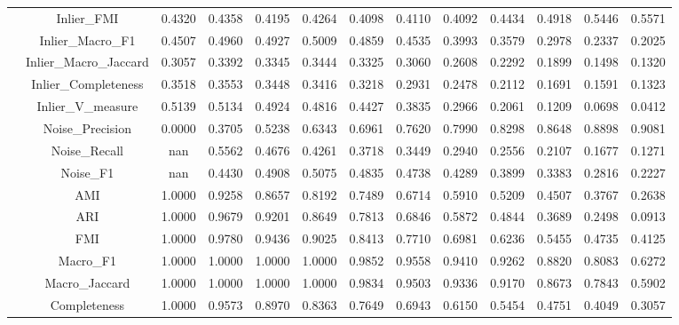 \begin{table}[ht!]
\begin{tabular*}{\linewidth}{@{} lc c c c c c c c c c c c @{}}
 & Inlier_FMI  & 0.4320 & 0.4358 & 0.4195 & 0.4264 & 0.4098 & 0.4110 & 0.4092 & 0.4434 & 0.4918 & 0.5446 & 0.5571 \\

 & Inlier_Macro_F1  & 0.4507 & 0.4960 & 0.4927 & 0.5009 & 0.4859 & 0.4535 & 0.3993 & 0.3579 & 0.2978 & 0.2337 & 0.2025 \\

 & Inlier_Macro_Jaccard  & 0.3057 & 0.3392 & 0.3345 & 0.3444 & 0.3325 & 0.3060 & 0.2608 & 0.2292 & 0.1899 & 0.1498 & 0.1320 \\

 & Inlier_Completeness  & 0.3518 & 0.3553 & 0.3448 & 0.3416 & 0.3218 & 0.2931 & 0.2478 & 0.2112 & 0.1691 & 0.1591 & 0.1323 \\

 & Inlier_V_measure  & 0.5139 & 0.5134 & 0.4924 & 0.4816 & 0.4427 & 0.3835 & 0.2966 & 0.2061 & 0.1209 & 0.0698 & 0.0412 \\

 & Noise_Precision  & 0.0000 & 0.3705 & 0.5238 & 0.6343 & 0.6961 & 0.7620 & 0.7990 & 0.8298 & 0.8648 & 0.8898 & 0.9081 \\

 & Noise_Recall  & nan & 0.5562 & 0.4676 & 0.4261 & 0.3718 & 0.3449 & 0.2940 & 0.2556 & 0.2107 & 0.1677 & 0.1271 \\

 & Noise_F1  & nan & 0.4430 & 0.4908 & 0.5075 & 0.4835 & 0.4738 & 0.4289 & 0.3899 & 0.3383 & 0.2816 & 0.2227 \\
\addlinespace
\multirow{17}{*}{DBSCAN}
 & AMI  & 1.0000 & 0.9258 & 0.8657 & 0.8192 & 0.7489 & 0.6714 & 0.5910 & 0.5209 & 0.4507 & 0.3767 & 0.2638 \\

 & ARI  & 1.0000 & 0.9679 & 0.9201 & 0.8649 & 0.7813 & 0.6846 & 0.5872 & 0.4844 & 0.3689 & 0.2498 & 0.0913 \\

 & FMI  & 1.0000 & 0.9780 & 0.9436 & 0.9025 & 0.8413 & 0.7710 & 0.6981 & 0.6236 & 0.5455 & 0.4735 & 0.4125 \\

 & Macro_F1  & 1.0000 & 1.0000 & 1.0000 & 1.0000 & 0.9852 & 0.9558 & 0.9410 & 0.9262 & 0.8820 & 0.8083 & 0.6272 \\

 & Macro_Jaccard  & 1.0000 & 1.0000 & 1.0000 & 1.0000 & 0.9834 & 0.9503 & 0.9336 & 0.9170 & 0.8673 & 0.7843 & 0.5902 \\

 & Completeness  & 1.0000 & 0.9573 & 0.8970 & 0.8363 & 0.7649 & 0.6943 & 0.6150 & 0.5454 & 0.4751 & 0.4049 & 0.3057 \\


\end{tabular*}
\end{table}
